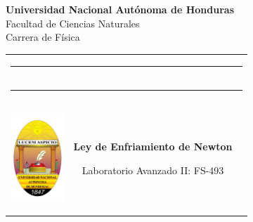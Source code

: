 %
%
%
%
%
\begin{titlepage}
  \noindent%

\begin{center}
  \Large{\textbf{Universidad Nacional Autónoma de Honduras}}\\
  \large Facultad de Ciencias Naturales\\
  Carrera de Física\\
\end{center}  
  
\center 
  \begin{tabular}{l c l}
  
  \multicolumn{3}{c}{\rule{150mm}{0.8mm}}\\
  \multicolumn{3}{c}{\rule[3mm]{150mm}{0.1mm}}\\

	\begin{minipage}{2cm}
    	\includegraphics[width=2cm, height = 4cm]{figures/miscelanea/UNAH_logo.jpg}
	\end{minipage} &
		
    \begin{minipage}{10cm}
    	\begin{center}
    		\huge{\textbf{
      			Ley de Enfriamiento de Newton%
    		}}
    	\end{center}
    	\begin{center}
      		\Large{
       			 Laboratorio Avanzado II: FS-493%
      		}
    	\end{center}
    \end{minipage} &


\end{tabular}
\end{titlepage}
